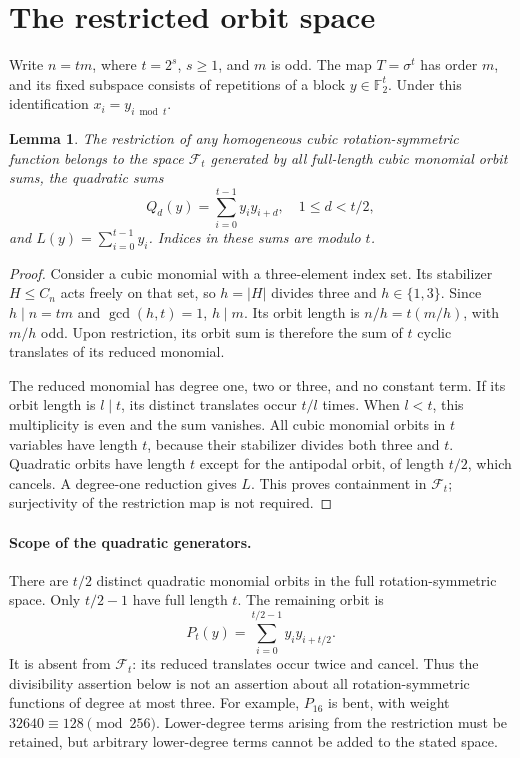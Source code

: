 \documentclass[11pt,a4paper]{article}
\newtheorem{lemma}[theorem]{Lemma}
\newcommand{\F}{\mathbb F_2}
\begin{document}
\section{The restricted orbit space}
Write $n=tm$, where $t=2^s$, $s\ge1$, and $m$ is odd. The map $T=\sigma^t$ has order $m$, and its fixed subspace consists of repetitions of a block $y\in\F^t$. Under this identification $x_i=y_{i\bmod t}$.

\begin{lemma}\label{lem:orbit}
The restriction of any homogeneous cubic rotation-symmetric function belongs to the space $\mathcal F_t$ generated by all full-length cubic monomial orbit sums, the quadratic sums
\[Q_d(y)=\sum_{i=0}^{t-1}y_i y_{i+d},\quad 1\le d<t/2,\]
and $L(y)=\sum_{i=0}^{t-1}y_i$. Indices in these sums are modulo $t$.
\end{lemma}
\begin{proof}
Consider a cubic monomial with a three-element index set. Its stabilizer $H\le C_n$ acts freely on that set, so $h=|H|$ divides three and $h\in\{1,3\}$. Since $h\mid n=tm$ and $\gcd(h,t)=1$, $h\mid m$. Its orbit length is $n/h=t(m/h)$, with $m/h$ odd. Upon restriction, its orbit sum is therefore the sum of $t$ cyclic translates of its reduced monomial.

The reduced monomial has degree one, two or three, and no constant term. If its orbit length is $l\mid t$, its distinct translates occur $t/l$ times. When $l<t$, this multiplicity is even and the sum vanishes. All cubic monomial orbits in $t$ variables have length $t$, because their stabilizer divides both three and $t$. Quadratic orbits have length $t$ except for the antipodal orbit, of length $t/2$, which cancels. A degree-one reduction gives $L$. This proves containment in $\mathcal F_t$; surjectivity of the restriction map is not required.
\end{proof}

\paragraph{Scope of the quadratic generators.}
There are $t/2$ distinct quadratic monomial orbits in the full rotation-symmetric space. Only $t/2-1$ have full length $t$. The remaining orbit is
\[
 P_t(y)=\sum_{i=0}^{t/2-1}y_i y_{i+t/2}.
\]
It is absent from $\mathcal F_t$: its reduced translates occur twice and cancel. Thus the divisibility assertion below is not an assertion about all rotation-symmetric functions of degree at most three. For example, $P_{16}$ is bent, with weight $32640\equiv128\pmod{256}$. Lower-degree terms arising from the restriction must be retained, but arbitrary lower-degree terms cannot be added to the stated space.
\end{document}
